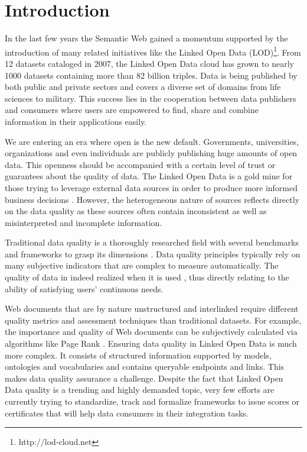 \documentclass[onecolumn, crcready]{iosart2c}
\begin{document}
\section{Introduction}
In the last few years the Semantic Web gained a momentum supported by the introduction of many related initiatives like the Linked Open Data (LOD)\footnote{http://lod-cloud.net}. From 12 datasets cataloged in 2007, the Linked Open Data cloud has grown to nearly 1000 datasets containing more than 82 billion triples. Data is being published by both public and private sectors and covers a diverse set of domains from life sciences to military. This success lies in the cooperation between data publishers and consumers where users are empowered to find, share and combine information in their applications easily.

We are entering an era where open is the new default. Governments, universities, organizations and even individuals are publicly publishing huge amounts of open data. This openness should be accompanied with a certain level of trust or guarantees about the quality of data. The Linked Open Data is a gold mine for those trying to leverage external data sources in order to produce more informed business decisions \cite{Boyd2011}. However, the heterogeneous nature of sources reflects directly on the data quality as these sources often contain inconsistent as well as misinterpreted and incomplete information.

Traditional data quality is a thoroughly researched field with several benchmarks and frameworks to grasp its dimensions \cite{Kahn2002}\cite{Stvilia2007}\cite{Wang1996}. Data quality principles typically rely on many subjective indicators that are complex to measure automatically. The quality of data in indeed realized when it is used \cite{juran-j-1999-quality}, thus directly relating to the ability of satisfying users' continuous needs.

Web documents that are by nature unstructured and interlinked require different quality metrics and assessment techniques than traditional datasets. For example, the importance and quality of Web documents can be subjectively calculated via algorithms like Page Rank \cite{ Lawrence981}.
Ensuring data quality in Linked Open Data is much more complex. It consists of structured information supported by models, ontologies and vocabularies and contains queryable endpoints and links. This makes data quality assurance a challenge. Despite the fact that Linked Open Data quality is a trending and highly demanded topic, very few efforts are currently trying to standardize, track and formalize frameworks to issue scores or certificates that will help data consumers in their integration tasks.\\
\end{document}
